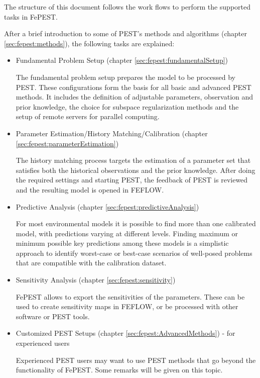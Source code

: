 The structure of this document follows the work flows to perform the supported tasks in FePEST. 

After a brief introduction  to some of PEST's methods and algorithms (chapter \ref{sec:fepest:methods}), the following tasks are explained: 

\begin{itemize}
\item Fundamental Problem Setup (chapter \ref{sec:fepest:fundamentalSetup})

The fundamental problem setup prepares the model to be processed by PEST. These configurations form the basis for all basic and advanced PEST methods. It includes the definition of adjustable parameters, observation and prior knowledge, the choice for subspace regularization methods and the setup of remote servers for parallel computing.

\item Parameter Estimation/History Matching/Calibration (chapter \ref{sec:fepest:parameterEstimation})

The history matching process targets the estimation of a parameter set that satisfies both the historical observations and the prior knowledge. After doing the required settings and starting PEST, the feedback of PEST is reviewed and the resulting model is opened in FEFLOW.

\item Predictive Analysis (chapter \ref{sec:fepest:predictiveAnalysis})

For most environmental models it is possible to find more than one calibrated model, with predictions varying at different levels. Finding maximum or minimum possible key predictions among these models is a simplistic approach to identify worst-case or best-case scenarios of well-posed problems that are compatible with the calibration dataset. 

\item Sensitivity Analysis (chapter \ref{sec:fepest:sensitivity})

FePEST allows to export the sensitivities of the parameters. These can be used to create sensitivity maps in FEFLOW, or be processed with other software or PEST tools.

\item Customized PEST Setups (chapter \ref{sec:fepest:AdvancedMethods}) - for experienced users 

Experienced PEST users may want to use PEST methods that go beyond the functionality of FePEST. Some remarks will be given on this topic.
\end{itemize}

